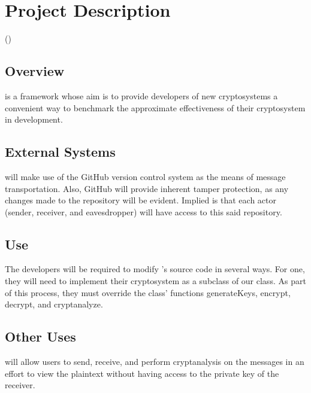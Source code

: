\section{Project Description}
(\md)



\subsection{Overview}
\cry{} is a framework whose aim is to provide developers of
new cryptosystems a convenient way to benchmark the
approximate effectiveness of their cryptosystem in
development.

\subsection{External Systems}
\cry{} will make use of the GitHub version control system
as the means of message transportation. Also, GitHub will
provide inherent tamper protection, as any changes made
to the repository will be evident. Implied is that each
actor (sender, receiver, and eavesdropper) will have access
to this said repository.

\subsection{Use}
The developers will be required to modify \cry's source
code in several ways. For one, they will need to implement
their cryptosystem as a subclass of our 
class. As part of this process, they must override the
 class' functions generateKeys, encrypt,
decrypt, and cryptanalyze.

\subsection{Other Uses}
\cry{} will allow users to send, receive, and perform
cryptanalysis on the messages in an effort to view the
plaintext without having access to the private key of
the receiver.
